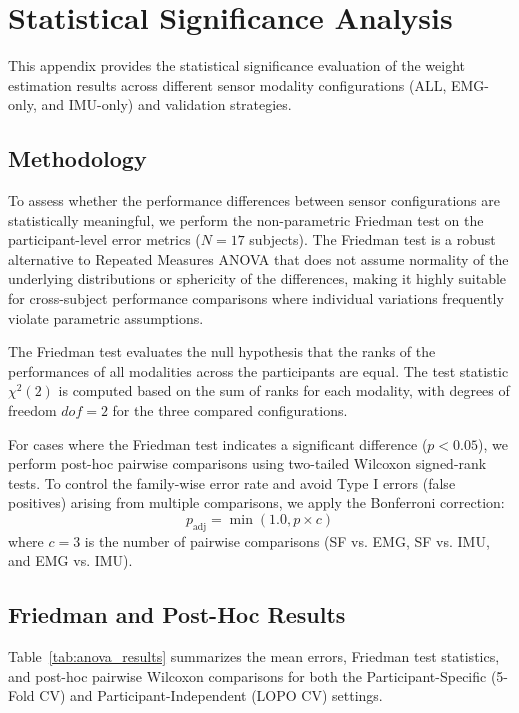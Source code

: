 \chapter{Statistical Significance Analysis}
\label{app:statistical_significance}

This appendix provides the statistical significance evaluation of the weight estimation results across different sensor modality configurations (ALL, EMG-only, and IMU-only) and validation strategies.

\section{Methodology}
To assess whether the performance differences between sensor configurations are statistically meaningful, we perform the non-parametric Friedman test on the participant-level error metrics ($N = 17$ subjects). The Friedman test is a robust alternative to Repeated Measures ANOVA that does not assume normality of the underlying distributions or sphericity of the differences, making it highly suitable for cross-subject performance comparisons where individual variations frequently violate parametric assumptions.

The Friedman test evaluates the null hypothesis that the ranks of the performances of all modalities across the participants are equal. The test statistic $\chi^2(2)$ is computed based on the sum of ranks for each modality, with degrees of freedom $dof = 2$ for the three compared configurations.

For cases where the Friedman test indicates a significant difference ($p < 0.05$), we perform post-hoc pairwise comparisons using two-tailed Wilcoxon signed-rank tests. To control the family-wise error rate and avoid Type I errors (false positives) arising from multiple comparisons, we apply the Bonferroni correction:
\begin{equation}
    p_{\text{adj}} = \min(1.0, p \times c)
\end{equation}
where $c = 3$ is the number of pairwise comparisons (SF vs. EMG, SF vs. IMU, and EMG vs. IMU).

\section{Friedman and Post-Hoc Results}
Table~\ref{tab:anova_results} summarizes the mean errors, Friedman test statistics, and post-hoc pairwise Wilcoxon comparisons for both the Participant-Specific (5-Fold CV) and Participant-Independent (LOPO CV) settings.

